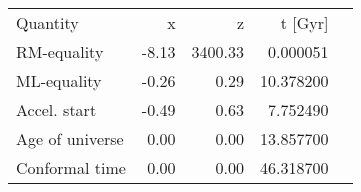 \begin{tabular}{lrrrl}
Quantity & x & z & t [Gyr] &  \\
RM-equality  & -8.13 & 3400.33 & 0.000051 &   \\
ML-equality  & -0.26 & 0.29 & 10.378200 &   \\
Accel. start  & -0.49 & 0.63 & 7.752490 &    \\
Age of universe  & 0.00 & 0.00 & 13.857700 &   \\
Conformal time  & 0.00 & 0.00 & 46.318700 &   \\
\end{tabular}
